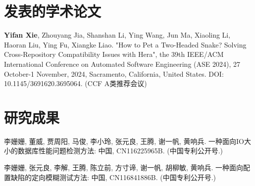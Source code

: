 
\begin{resume}
	
  
  \section*{发表的学术论文} %

  \begin{enumerate}[label={[\arabic*]},itemsep=0pt,parsep=0pt,labelindent=26pt,labelwidth=*,leftmargin=0pt,itemindent=*,align=left]
   
  \item \textbf{Yifan Xie}, Zhouyang Jia, Shanshan Li, Ying Wang, Jun Ma, Xiaoling Li, Haoran Liu, Ying Fu, Xiangke Liao. "How to Pet a Two-Headed Snake? Solving Cross-Repository Compatibility Issues with Hera", the 39th IEEE/ACM International Conference on Automated Software Engineering (ASE 2024), 27 October-1 November, 2024, Sacramento, California, United States. DOI: 10.1145/3691620.3695064. (CCF A类推荐会议)
  \end{enumerate}

  \section*{研究成果} %
  \begin{enumerate}[label={[\arabic*]},itemsep=0pt,parsep=0pt,labelindent=26pt,labelwidth=*,leftmargin=0pt,itemindent=*,align=left]
  \item 李姗姗, 董威, 贾周阳, 马俊, 李小玲, 张元良, 王腾, 谢一帆, 黄响兵. 一种面向IO大小的数据库性能问题检测方法: 中国, CN116225965B. (中国专利公开号.)
  \item 李姗姗, 张元良, 李解, 王腾, 陈立前, 方寸谛, 谢一帆, 胡柳敏, 黄响兵. 一种面向配置缺陷的定向模糊测试方法: 中国, CN116841886B. (中国专利公开号.)
  \end{enumerate}
\end{resume}
